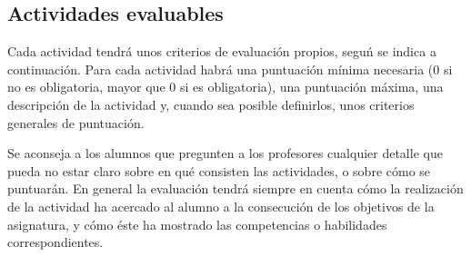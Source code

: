 \documentclass[a4paper,12pt]{article}
\begin{document}
\subsection{Actividades evaluables}

Cada actividad tendrá unos criterios de evaluación propios, seguń se indica a continuación. Para cada actividad habrá una puntuación mínima necesaria (0 si no es obligatoria, mayor que 0 si es obligatoria), una puntuación máxima, una descripción de la actividad y, cuando sea posible definirlos, unos criterios generales de puntuación.

Se aconseja a los alumnos que pregunten a los profesores cualquier detalle que pueda no estar claro sobre en qué consisten las actividades, o sobre cómo se puntuarán. En general la evaluación tendrá siempre en cuenta cómo la realización de la actividad ha acercado al alumno a la consecución de los objetivos de la asignatura, y cómo éste ha mostrado las competencias o habilidades correspondientes.
\end{document}
